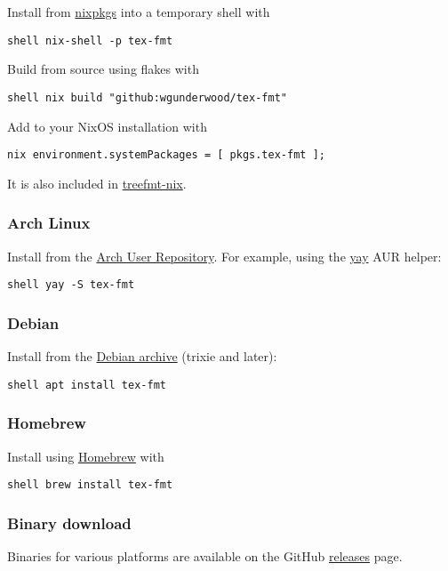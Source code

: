 \documentclass{scrartcl}
\begin{document}
Install from
\href{https://search.nixos.org/packages?channel=unstable&query=tex-fmt}{nixpkgs}
into a temporary shell with

\texttt{shell
nix-shell -p tex-fmt
}

Build from source using flakes with

\texttt{shell
nix build "github:wgunderwood/tex-fmt"
}

Add to your NixOS installation with

\texttt{nix
environment.systemPackages = {[}
  pkgs.tex-fmt
{]};
}

It is also included in
\href{https://github.com/numtide/treefmt-nix/tree/main}{treefmt-nix}.

\subsubsection{Arch Linux}\hypertarget{arch-linux}{}\label{arch-linux}

Install from the
\href{https://aur.archlinux.org/packages/tex-fmt}{Arch User Repository}.
For example, using the \href{https://github.com/Jguer/yay}{yay} AUR helper:

\texttt{shell
yay -S tex-fmt
}

\subsubsection{Debian}\hypertarget{debian}{}\label{debian}

Install from the \href{https://www.debian.org/distrib/packages}{Debian archive}
(trixie and later):

\texttt{shell
apt install tex-fmt
}

\subsubsection{Homebrew}\hypertarget{homebrew}{}\label{homebrew}

Install using
\href{https://formulae.brew.sh/formula/tex-fmt}{Homebrew} with

\texttt{shell
brew install tex-fmt
}

\subsubsection{Binary download}\hypertarget{binary-download}{}\label{binary-download}

Binaries for various platforms are available on the GitHub
\href{https://github.com/WGUNDERWOOD/tex-fmt/releases}{releases} page.
\end{document}
